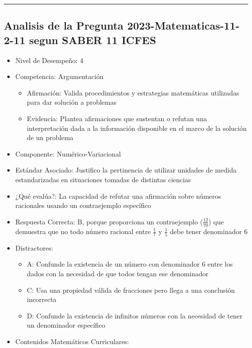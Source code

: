 \documentclass[
]{article}
\providecommand{\tightlist}{%
  \setlength{\itemsep}{0pt}\setlength{\parskip}{0pt}}
\begin{document}
\begin{center}\rule{0.5\linewidth}{0.5pt}\end{center}

\subsection{Analisis de la Pregunta 2023-Matematicas-11-2-11 segun SABER
11
ICFES}\label{analisis-de-la-pregunta-2023-matematicas-11-2-11-segun-saber-11-icfes}

\begin{itemize}
\item
  Nivel de Desempeño: 4
\item
  Competencia: Argumentación

  \begin{itemize}
  \tightlist
  \item
    Afirmación: Valida procedimientos y estrategias matemáticas
    utilizadas para dar solución a problemas
  \item
    Evidencia: Plantea afirmaciones que sustentan o refutan una
    interpretación dada a la información disponible en el marco de la
    solución de un problema
  \end{itemize}
\item
  Componente: Numérico-Variacional
\item
  Estándar Asociado: Justifico la pertinencia de utilizar unidades de
  medida estandarizadas en situaciones tomadas de distintas ciencias
\item
  ¿Qué evalúa?: La capacidad de refutar una afirmación sobre números
  racionales usando un contraejemplo específico
\item
  Respuesta Correcta: B, porque proporciona un contraejemplo
  (\(\frac{12}{70}\)) que demuestra que no todo número racional entre
  \(\frac{1}{7}\) y \(\frac{1}{5}\) debe tener denominador 6
\item
  Distractores:

  \begin{itemize}
  \tightlist
  \item
    A: Confunde la existencia de un número con denominador 6 entre los
    dados con la necesidad de que todos tengan ese denominador
  \item
    C: Usa una propiedad válida de fracciones pero llega a una
    conclusión incorrecta
  \item
    D: Confunde la existencia de infinitos números con la necesidad de
    tener un denominador específico
  \end{itemize}
\item
  Contenidos Matemáticos Curriculares:


\end{itemize}
\end{document}
